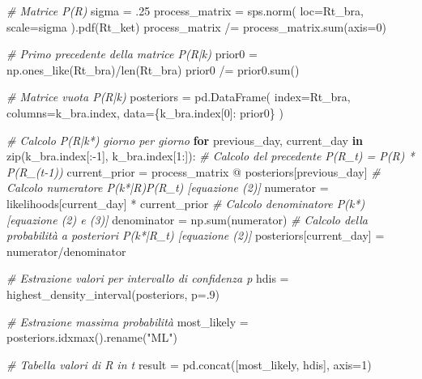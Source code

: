 \documentclass[11pt]{article}
\newenvironment{Shaded}{}{}
\newcommand{\KeywordTok}[1]{\textcolor[rgb]{0.00,0.44,0.13}{\textbf{{#1}}}}
\newcommand{\DecValTok}[1]{\textcolor[rgb]{0.25,0.63,0.44}{{#1}}}
\newcommand{\FloatTok}[1]{\textcolor[rgb]{0.25,0.63,0.44}{{#1}}}
\newcommand{\StringTok}[1]{\textcolor[rgb]{0.25,0.44,0.63}{{#1}}}
\newcommand{\CommentTok}[1]{\textcolor[rgb]{0.38,0.63,0.69}{\textit{{#1}}}}
\newcommand{\NormalTok}[1]{{#1}}
\newcommand{\ControlFlowTok}[1]{\textcolor[rgb]{0.00,0.44,0.13}{\textbf{{#1}}}}
\newcommand{\OperatorTok}[1]{\textcolor[rgb]{0.40,0.40,0.40}{{#1}}}
\newcommand{\BuiltInTok}[1]{{#1}}
\begin{document}
\begin{Shaded}
\begin{Highlighting}[]
\CommentTok{\# Matrice P(R)}
\NormalTok{sigma }\OperatorTok{=} \FloatTok{.25}
\NormalTok{process\_matrix }\OperatorTok{=}\NormalTok{ sps.norm(}
\NormalTok{    loc}\OperatorTok{=}\NormalTok{Rt\_bra,}
\NormalTok{    scale}\OperatorTok{=}\NormalTok{sigma}
\NormalTok{).pdf(Rt\_ket)}
\NormalTok{process\_matrix }\OperatorTok{/=}\NormalTok{ process\_matrix.}\BuiltInTok{sum}\NormalTok{(axis}\OperatorTok{=}\DecValTok{0}\NormalTok{)}

\CommentTok{\# Primo precedente della matrice P(R|k)}
\NormalTok{prior0 }\OperatorTok{=}\NormalTok{ np.ones\_like(Rt\_bra)}\OperatorTok{/}\BuiltInTok{len}\NormalTok{(Rt\_bra)}
\NormalTok{prior0 }\OperatorTok{/=}\NormalTok{ prior0.}\BuiltInTok{sum}\NormalTok{()}

\CommentTok{\# Matrice vuota P(R|k)}
\NormalTok{posteriors }\OperatorTok{=}\NormalTok{ pd.DataFrame(}
\NormalTok{    index}\OperatorTok{=}\NormalTok{Rt\_bra,}
\NormalTok{    columns}\OperatorTok{=}\NormalTok{k\_bra.index,}
\NormalTok{    data}\OperatorTok{=}\NormalTok{\{k\_bra.index[}\DecValTok{0}\NormalTok{]: prior0\}}
\NormalTok{)}

\CommentTok{\# Calcolo P(R|k*) giorno per giorno}
\ControlFlowTok{for}\NormalTok{ previous\_day, current\_day }\KeywordTok{in} \BuiltInTok{zip}\NormalTok{(k\_bra.index[:}\OperatorTok{{-}}\DecValTok{1}\NormalTok{], k\_bra.index[}\DecValTok{1}\NormalTok{:]):}
    \CommentTok{\# Calcolo del precedente P(R\_t) = P(R) * P(R\_(t{-}1))}
\NormalTok{    current\_prior }\OperatorTok{=}\NormalTok{ process\_matrix }\OperatorTok{@}\NormalTok{ posteriors[previous\_day]}
    \CommentTok{\# Calcolo numeratore P(k*|R)P(R\_t) [equazione (2)]}
\NormalTok{    numerator }\OperatorTok{=}\NormalTok{ likelihoods[current\_day] }\OperatorTok{*}\NormalTok{ current\_prior}
    \CommentTok{\# Calcolo denominatore P(k*) [equazione (2) e (3)]}
\NormalTok{    denominator }\OperatorTok{=}\NormalTok{ np.}\BuiltInTok{sum}\NormalTok{(numerator)}
    \CommentTok{\# Calcolo della probabilità a posteriori P(k*|R\_t) [equazione (2)]}
\NormalTok{    posteriors[current\_day] }\OperatorTok{=}\NormalTok{ numerator}\OperatorTok{/}\NormalTok{denominator}

\CommentTok{\# Estrazione valori per intervallo di confidenza p}
\NormalTok{hdis }\OperatorTok{=}\NormalTok{ highest\_density\_interval(posteriors, p}\OperatorTok{=}\FloatTok{.9}\NormalTok{)}

\CommentTok{\# Estrazione massima probabilità}
\NormalTok{most\_likely }\OperatorTok{=}\NormalTok{ posteriors.idxmax().rename(}\StringTok{"ML"}\NormalTok{)}

\CommentTok{\# Tabella valori di R in t}
\NormalTok{result }\OperatorTok{=}\NormalTok{ pd.concat([most\_likely, hdis], axis}\OperatorTok{=}\DecValTok{1}\NormalTok{)}
\end{Highlighting}
\end{Shaded}


    
    



    
\end{document}
